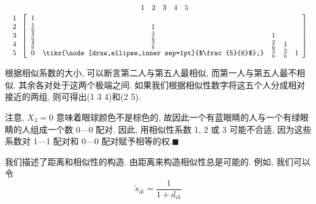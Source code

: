 \[
\begin{array}{r@{\;}c}
 & \begin{array}{ccccc}1&2&3&4&5\end{array}\\[2pt]
\begin{array}{r}1\\2\\3\\4\\5\end{array} &
\left[\begin{array}{ccccc}
1&&&&\\
\frac{1}{6}&1&&&\\
\frac{4}{6}&\frac{3}{6}&1&&\\
\frac{4}{6}&\frac{3}{6}&\frac{2}{6}&1&\\
0&\tikz{\node[draw,ellipse,inner sep=1pt]{$\frac{5}{6}$};}&\frac{2}{6}&\frac{2}{6}&1
\end{array}\right]
\end{array}
\]

根据相似系数的大小, 可以断言第二人与第五人最相似, 而第一人与第五人最不相似. 其余各对处于这两个极端之间. 如果我们根据相似性数字将这五个人分成相对接近的两组, 则可得出(1 3 4)和(2 5).

注意, $X_3=0$ 意味着眼球颜色不是棕色的, 故因此一个有蓝眼睛的人与一个有绿眼睛的人组成一个数 0—0 配对. 因此, 用相似性系数 1, 2 或 3 可能不合适, 因为这些系数对 1—1 配对和 0—0 配对赋予相等的权.\hfill$\blacksquare$

我们描述了距离和相似性的构造. 由距离来构造相似性总是可能的. 例如, 我们可以令
\label{eq:12-8}
\begin{equation}
\tilde{s}_{ik}=\frac{1}{1+d_{ik}}
\tag{12-8}
\end{equation}
